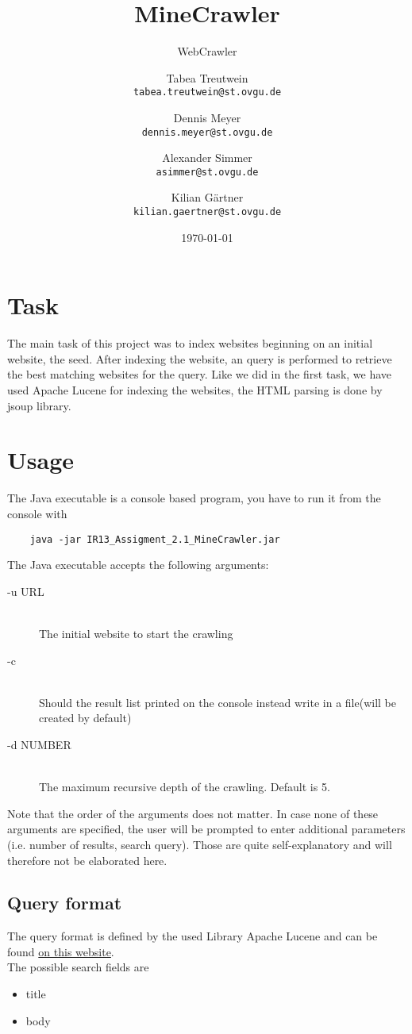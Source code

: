 \documentclass{scrartcl}
\title{MineCrawler}
\subtitle{WebCrawler}
\author{
  Tabea Treutwein\\
  \texttt{tabea.treutwein@st.ovgu.de}\\
  \and
  Dennis Meyer\\
  \texttt{dennis.meyer@st.ovgu.de}\\
  \and
  Alexander Simmer\\
  \texttt{asimmer@st.ovgu.de}\\
  \and
  Kilian Gärtner\\
  \texttt{kilian.gaertner@st.ovgu.de}\\
}
\date{\today}
\begin{document}
\maketitle
 
\section{Task}
The main task of this project was to index websites beginning on an initial website, the seed. After indexing the website, an query is performed to retrieve the best matching websites for the query. Like we did in the first task, we have used Apache Lucene for indexing the websites, the HTML parsing is done by jsoup library.

\section{Usage}

The Java executable is a console based program, you have to run it from the console with
\begin{verbatim}
	java -jar IR13_Assigment_2.1_MineCrawler.jar
\end{verbatim}
The Java executable accepts the following arguments:

\begin{description}
  \item[-u URL] \hfill \\
  The initial website to start the crawling
  \item[-c] \hfill \\
  Should the result list printed on the console instead write in a file(will be created by default)
  \item[-d NUMBER] \hfill \\
  The maximum recursive depth of the crawling. Default is 5. 
\end{description}
Note that the order of the arguments does not matter. In case none of these arguments are specified, the user will be prompted to enter additional parameters (i.e. number of results, search query). Those are quite self-explanatory and will therefore not be elaborated here.

\subsection{Query format}
The query format is defined by the used Library Apache Lucene and can be found \href{http://lucene.apache.org/core/4_6_0/queryparser/org/apache/lucene/queryparser/classic/package-summary.html#package_description}{on this website}.  \\
The possible search fields are 
\begin{itemize}
	\item title
	\item body
\end{itemize}
\end{document}

